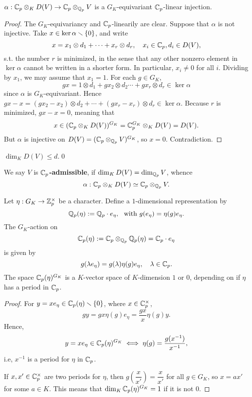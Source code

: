 \begin{proposition}\label{Cp tensor D(V) injects in Cp tensor V}
    $\alpha : \mathbb{C}_p\otimes_{K} D(V)\to\mathbb{C}_p\otimes_{\mathbb{Q}_p}V$ is a $G_K$-equivariant $\mathbb{C}_p$-linear injection.
\end{proposition}
\begin{proof}
    The $G_K$-equivariancy and $\mathbb{C}_p$-linearily are clear. Suppose that $\alpha$ is not injective. Take $x\in\ker\alpha\smallsetminus\{0\}$,
    and write \[x = x_1\otimes d_1 + \dots + x_r\otimes d_r, \quad x_i\in\mathbb{C}_p, d_i\in D(V),\]
    s.t. the number {\color{blue}$r$ is minimized},
    in the sense that any other nonzero element in $\ker\alpha$ cannot be written in a shorter form.
    In particular, $x_i\ne 0$ for all $i$.
    Dividing by $x_1$, we may assume that $x_1 = 1$.
    For each $g\in G_K$,
    \[gx = 1\otimes d_1 + gx_2\otimes d_2 \cdots + gx_r\otimes d_r\in \ker\alpha\]
    since $\alpha$ is $G_K$-equivariant.
    Hence $gx - x = (gx_2 - x_2)\otimes d_2 + \cdots + (gx_r - x_r)\otimes d_r\in\ker\alpha$.
    Because $r$ is minimized, $gx - x = 0$,
    meaning that \[x\in (\mathbb{C}_p\otimes_{K} D(V))^{G_K} = \mathbb{C}_p^{G_K}\otimes_K D(V) = D(V).\]
    But $\alpha$ is injective on $D(V) = (\mathbb{C}_p\otimes_{\mathbb{Q}_p} V)^{G_K}$, so $x = 0$.
    Contradiction.
\end{proof}
\begin{corollary}
    $\dim_K D(V)\le d$.\qed
\end{corollary}

We say $V$ is \textbf{$\mathbb{C}_p$-admissible},
if $\dim_K D(V) = \dim_{\mathbb{Q}_p} V$,
whence \[\alpha : \mathbb{C}_p\otimes_{K} D(V)\simeq\mathbb{C}_p\otimes_{\mathbb{Q}_p} V.\]

\begin{example}
Let $\eta : G_K\to\mathbb{Z}_p^\times$ be a character.
Define a $1$-dimensional representation by\[\mathbb{Q}_p(\eta) := \mathbb{Q}_p\cdot e_\eta,\ \text{ with } g(e_\eta) = \eta(g)e_\eta.\]
The $G_K$-action on \[\mathbb{C}_p(\eta) := \mathbb{C}_p\otimes_{\mathbb{Q}_p} \mathbb{Q}_p(\eta) = \mathbb{C}_p\cdot e_\eta\]
is given by \[g(\lambda e_\eta) = g(\lambda) \eta(g)e_\eta,\quad \lambda\in\mathbb{C}_p.\]
The space $\mathbb{C}_p(\eta)^{G_K}$ is a $K$-vector space of $K$-dimension $1$ or $0$, depending on if $\eta$ has a period in $\mathbb{C}_p$.

\begin{proof}
For $y = xe_\eta\in\mathbb{C}_p(\eta)\smallsetminus\{0\}$, where $x\in\mathbb{C}_p^\times$,
\[gy = gx\eta(g)e_\eta = \frac{gx}{x}\eta(g)y.\]
Hence, \[y = xe_\eta\in\mathbb{C}_p(\eta)^{G_K}\iff \eta(g) = \frac{g(x^{-1})}{x^{-1}},\]
i.e, $x^{-1}$ is a period for $\eta$ in $\mathbb{C}_p$.

If $x,x'\in \mathbb{C}_p^\times$ are two periods for $\eta$, then $g\left( \dfrac{x}{x'} \right) = \dfrac{x}{x'}$ for all $g\in G_K$, so $x = ax'$ for some $a\in K$. This means that $\dim_{K}\mathbb{C}_p(\eta)^{G_K} = 1$ if it is not $0$.
\end{proof}
\end{example}

